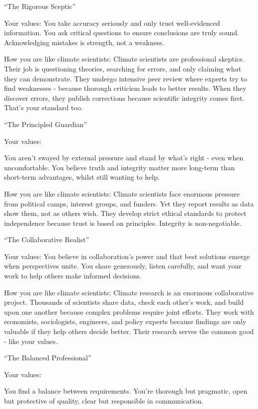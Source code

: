 \documentclass[
  letterpaper,
  DIV=11,
  numbers=noendperiod]{scrartcl}
\begin{document}
``The Rigorous Sceptic''

Your values: You take accuracy seriously and only trust well-evidenced
information. You ask critical questions to ensure conclusions are truly
sound. Acknowledging mistakes is strength, not a weakness.

How you are like climate scientists: Climate scientists are professional
skeptics. Their job is questioning theories, searching for errors, and
only claiming what they can demonstrate. They undergo intensive peer
review where experts try to find weaknesses - because thorough criticism
leads to better results. When they discover errors, they publish
corrections because scientific integrity comes first. That's your
standard too.

``The Principled Guardian''

Your values:

You aren't swayed by external pressure and stand by what's right - even
when uncomfortable. You believe truth and integrity matter more
long-term than short-term advantages, whilst still wanting to help.

How you are like climate scientists: Climate scientists face enormous
pressure from political camps, interest groups, and funders. Yet they
report results as data show them, not as others wish. They develop
strict ethical standards to protect independence because trust is based
on principles. Integrity is non-negotiable.

``The Collaborative Realist''

Your values: You believe in collaboration's power and that best
solutions emerge when perspectives unite. You share generously, listen
carefully, and want your work to help others make informed decisions.

How you are like climate scientists: Climate research is an enormous
collaborative project. Thousands of scientists share data, check each
other's work, and build upon one another because complex problems
require joint efforts. They work with economists, sociologists,
engineers, and policy experts because findings are only valuable if they
help others decide better. Their research serves the common good - like
your values.

``The Balanced Professional''

Your values:

You find a balance between requirements. You're thorough but pragmatic,
open but protective of quality, clear but responsible in communication.
\end{document}
